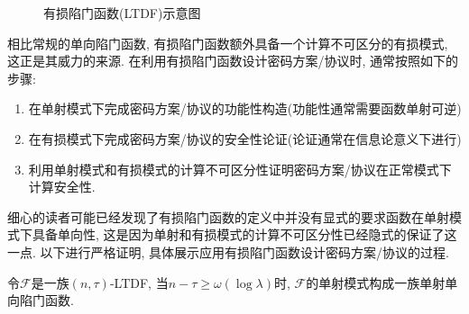\begin{figure}[!hbtp]
\begin{center}
\end{center}
\caption{有损陷门函数(LTDF)示意图}
\end{figure}

相比常规的单向陷门函数, 有损陷门函数额外具备一个计算不可区分的有损模式, 这正是其威力的来源. 
在利用有损陷门函数设计密码方案/协议时, 通常按照如下的步骤:
\begin{enumerate}
	\item 在单射模式下完成密码方案/协议的功能性构造(功能性通常需要函数单射可逆)
	\item 在有损模式下完成密码方案/协议的安全性论证(论证通常在信息论意义下进行)
	\item 利用单射模式和有损模式的计算不可区分性证明密码方案/协议在正常模式下计算安全性. 
\end{enumerate} 

细心的读者可能已经发现了有损陷门函数的定义中并没有显式的要求函数在单射模式下具备单向性, 
这是因为单射和有损模式的计算不可区分性已经隐式的保证了这一点. 以下进行严格证明, 具体展示应用有损陷门函数设计密码方案/协议的过程. 

\begin{theorem}
令$\mathcal{F}$是一族$(n, \tau)$-LTDF, 当$n - \tau \geq \omega(\log \lambda)$时, 
$\mathcal{F}$的单射模式构成一族单射单向陷门函数.  
\end{theorem}

